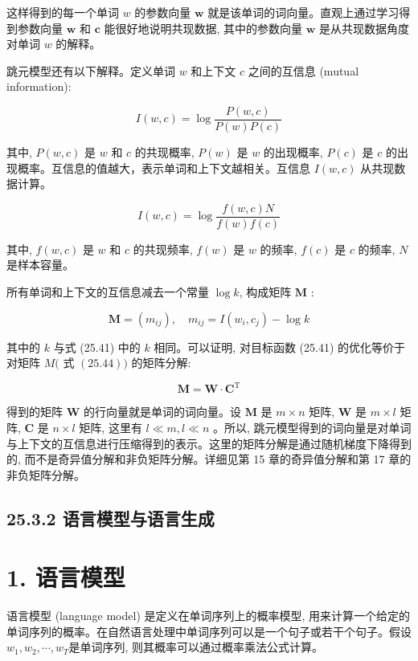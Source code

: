 \documentclass[10pt]{article}
\begin{document}
这样得到的每一个单词 $w$ 的参数向量 $\boldsymbol{w}$ 就是该单词的词向量。直观上通过学习得到参数向量 $\boldsymbol{w}$ 和 $\boldsymbol{c}$ 能很好地说明共现数据, 其中的参数向量 $\boldsymbol{w}$ 是从共现数据角度对单词 $w$ 的解释。

跳元模型还有以下解释。定义单词 $w$ 和上下文 $c$ 之间的互信息 (mutual information):


\begin{equation*}
I(w, c)=\log \frac{P(w, c)}{P(w) P(c)} \tag{25.42}
\end{equation*}


其中, $P(w, c)$ 是 $w$ 和 $c$ 的共现概率, $P(w)$ 是 $w$ 的出现概率, $P(c)$ 是 $c$ 的出现概率。互信息的值越大，表示单词和上下文越相关。互信息 $I(w, c)$ 从共现数据计算。


\begin{equation*}
I(w, c)=\log \frac{f(w, c) N}{f(w) f(c)} \tag{25.43}
\end{equation*}


其中, $f(w, c)$ 是 $w$ 和 $c$ 的共现频率, $f(w)$ 是 $w$ 的频率, $f(c)$ 是 $c$ 的频率, $N$ 是样本容量。

所有单词和上下文的互信息减去一个常量 $\log k$, 构成矩阵 $\boldsymbol{M}$ :


\begin{equation*}
\boldsymbol{M}=\left(m_{i j}\right), \quad m_{i j}=I\left(w_{i}, c_{j}\right)-\log k \tag{25.44}
\end{equation*}


其中的 $k$ 与式 (25.41) 中的 $k$ 相同。可以证明, 对目标函数 (25.41) 的优化等价于对矩阵 $M($ 式 $(25.44))$ 的矩阵分解:


\begin{equation*}
\boldsymbol{M}=\boldsymbol{W} \cdot \boldsymbol{C}^{\mathrm{T}} \tag{25.45}
\end{equation*}


得到的矩阵 $\boldsymbol{W}$ 的行向量就是单词的词向量。设 $\boldsymbol{M}$ 是 $m \times n$ 矩阵, $\boldsymbol{W}$ 是 $m \times l$ 矩阵, $\boldsymbol{C}$ 是 $n \times l$ 矩阵, 这里有 $l \ll m, l \ll n$ 。所以, 跳元模型得到的词向量是对单词与上下文的互信息进行压缩得到的表示。这里的矩阵分解是通过随机梯度下降得到的, 而不是奇异值分解和非负矩阵分解。详细见第 15 章的奇异值分解和第 17 章的非负矩阵分解。

\subsection*{25.3.2 语言模型与语言生成}
\section*{1. 语言模型}
语言模型 (language model) 是定义在单词序列上的概率模型, 用来计算一个给定的单词序列的概率。在自然语言处理中单词序列可以是一个句子或若干个句子。假设 $w_{1}, w_{2}, \cdots, w_{T}$是单词序列, 则其概率可以通过概率乘法公式计算。
\end{document}
